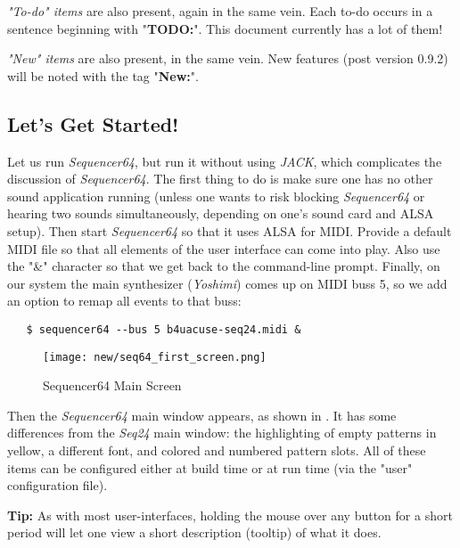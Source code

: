 \documentclass[
 11pt,
 twoside,
 a4paper,
 headinclude,
 footinclude,
 final                                 %
]{article}
\begin{document}
   \textsl{"To-do" items}
   are also present, again in the same vein.
   Each to-do occurs in a sentence beginning with "\textbf{TODO:}".
   This document currently has a lot of them!

   \textsl{"New" items}
   are also present, in the same vein.
   New features (post version 0.9.2) will be noted with the tag
   "\textbf{New:}".

\subsection{Let's Get Started!}
\label{subsec:introduction_lets_get_started}

   Let us run \textsl{Sequencer64}, but run it without using \textsl{JACK},
   which complicates the discussion of \textsl{Sequencer64}.  The first
   thing to do is make sure one has no other sound application running
   (unless one wants to risk blocking \textsl{Sequencer64} or hearing two
    sounds simultaneously, depending on one's sound card and ALSA setup).
   Then start \textsl{Sequencer64} so that it uses ALSA for MIDI.  Provide a
   default MIDI file so that all elements of the user interface can come
   into play.  Also use the "\&" character so that we get back to the
   command-line prompt.  Finally, on our system the main synthesizer
   (\textsl{Yoshimi}) comes up on MIDI buss 5, so we add an option to remap
   all events to that buss:

\begin{verbatim}
   $ sequencer64 --bus 5 b4uacuse-seq24.midi &
\end{verbatim}

\begin{figure}[H]
   \centering 
   \texttt{[image: new/seq64\_first\_screen.png]}
   \caption{Sequencer64 Main Screen}
   \label{fig:seq64_main_screen}
\end{figure}

   Then the \textsl{Sequencer64} main window appears, as shown in
   .  It has some differences
   from the \textsl{Seq24} main window: the highlighting of
   empty patterns in yellow, a different font, and colored and numbered pattern
   slots.  All of these items can be configured either at build time or at run
   time (via the "user" configuration file).

   \textbf{Tip:}
   As with most user-interfaces, holding the mouse over any button for a
   short period will let one view a short description (tooltip)
   of what it does.
\end{document}
